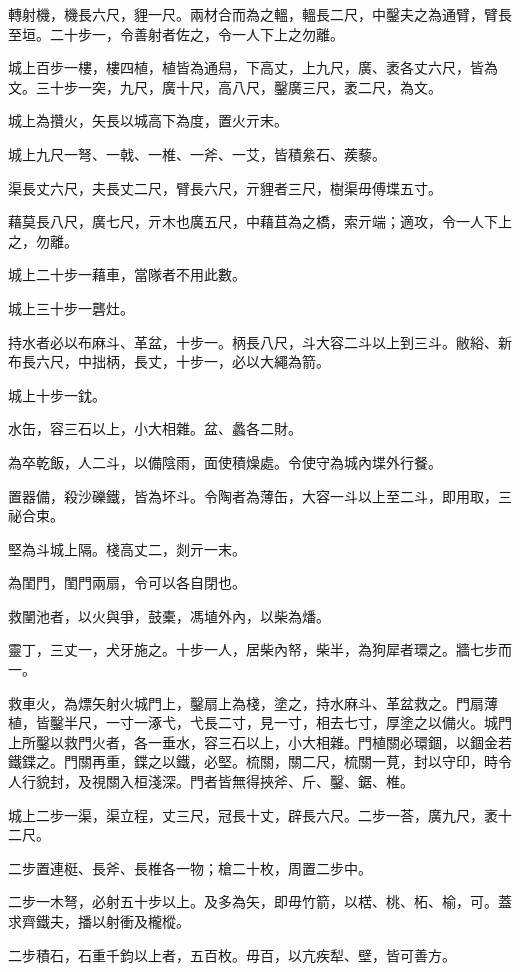 \begin{pinyinscope}
轉射機，機長六尺，貍一尺。兩材合而為之轀，轀長二尺，中鑿夫之為通臂，臂長至垣。二十步一，令善射者佐之，令一人下上之勿離。

城上百步一樓，樓四植，植皆為通舄，下高丈，上九尺，廣、袤各丈六尺，皆為文。三十步一突，九尺，廣十尺，高八尺，鑿廣三尺，袤二尺，為文。

城上為攢火，矢長以城高下為度，置火亓末。

城上九尺一弩、一戟、一椎、一斧、一艾，皆積絫石、蒺藜。

渠長丈六尺，夫長丈二尺，臂長六尺，亓貍者三尺，樹渠毋傅堞五寸。

藉莫長八尺，廣七尺，亓木也廣五尺，中藉苴為之橋，索亓端；適攻，令一人下上之，勿離。

城上二十步一藉車，當隊者不用此數。

城上三十步一礱灶。

持水者必以布麻斗、革盆，十步一。柄長八尺，斗大容二斗以上到三斗。敝綌、新布長六尺，中拙柄，長丈，十步一，必以大繩為箭。

城上十步一鈂。

水缶，容三石以上，小大相雜。盆、蠡各二財。

為卒乾飯，人二斗，以備陰雨，面使積燥處。令使守為城內堞外行餐。

置器備，殺沙礫鐵，皆為坏斗。令陶者為薄缶，大容一斗以上至二斗，即用取，三祕合束。

堅為斗城上隔。棧高丈二，剡亓一末。

為閨門，閨門兩扇，令可以各自閉也。

救闉池者，以火與爭，鼓橐，馮埴外內，以柴為燔。

靈丁，三丈一，犬牙施之。十步一人，居柴內帑，柴半，為狗犀者環之。牆七步而一。

救車火，為熛矢射火城門上，鑿扇上為棧，塗之，持水麻斗、革盆救之。門扇薄植，皆鑿半尺，一寸一涿弋，弋長二寸，見一寸，相去七寸，厚塗之以備火。城門上所鑿以救門火者，各一垂水，容三石以上，小大相雜。門植關必環錮，以錮金若鐵鍱之。門關再重，鍱之以鐵，必堅。梳關，關二尺，梳關一莧，封以守印，時令人行貌封，及視關入桓淺深。門者皆無得挾斧、斤、鑿、鋸、椎。

城上二步一渠，渠立程，丈三尺，冠長十丈，辟長六尺。二步一荅，廣九尺，袤十二尺。

二步置連梃、長斧、長椎各一物；槍二十枚，周置二步中。

二步一木弩，必射五十步以上。及多為矢，即毋竹箭，以楛、桃、柘、榆，可。蓋求齊鐵夫，播以射衝及櫳樅。

二步積石，石重千鈞以上者，五百枚。毋百，以亢疾犁、壁，皆可善方。


\end{pinyinscope}
